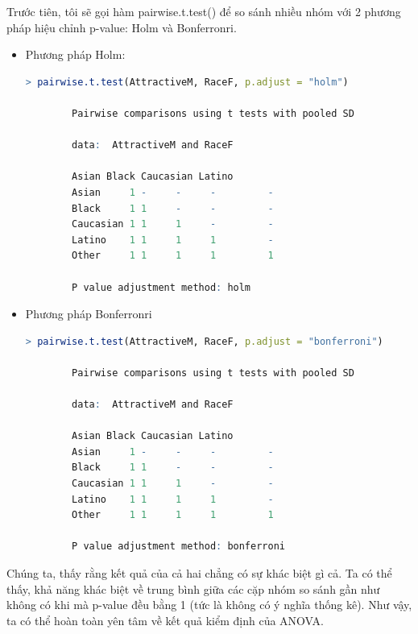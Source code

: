 \documentclass[a4paper,12pt]{article}
\begin{document}
	Trước tiên, tôi sẽ gọi hàm pairwise.t.test() để so sánh nhiều nhóm với 2 phương pháp hiệu chỉnh p-value: Holm và Bonferronri.\\
	\begin{itemize}
		\item Phương pháp Holm:
		\begin{lstlisting}[language=R]
		> pairwise.t.test(AttractiveM, RaceF, p.adjust = "holm")
		
		Pairwise comparisons using t tests with pooled SD 
		
		data:  AttractiveM and RaceF 
		
		Asian Black Caucasian Latino
		Asian     1 -     -     -         -     
		Black     1 1     -     -         -     
		Caucasian 1 1     1     -         -     
		Latino    1 1     1     1         -     
		Other     1 1     1     1         1     
		
		P value adjustment method: holm 
		\end{lstlisting}
		\item Phương pháp Bonferronri
		\begin{lstlisting}[language=R]
		> pairwise.t.test(AttractiveM, RaceF, p.adjust = "bonferroni")
		
		Pairwise comparisons using t tests with pooled SD 
		
		data:  AttractiveM and RaceF 
		
		Asian Black Caucasian Latino
		Asian     1 -     -     -         -     
		Black     1 1     -     -         -     
		Caucasian 1 1     1     -         -     
		Latino    1 1     1     1         -     
		Other     1 1     1     1         1     
		
		P value adjustment method: bonferroni 
		\end{lstlisting}
	\end{itemize}

	Chúng ta, thấy rằng kết quả của cả hai chẳng có sự khác biệt gì cả. Ta có thể thấy, khả năng khác biệt về trung bình giữa các cặp nhóm so sánh gần như không có khi mà p-value đều bằng 1 (tức là không có ý nghĩa thống kê). Như vậy, ta có thể hoàn toàn yên tâm về kết quả kiểm định của ANOVA.\\
	
\end{document}
